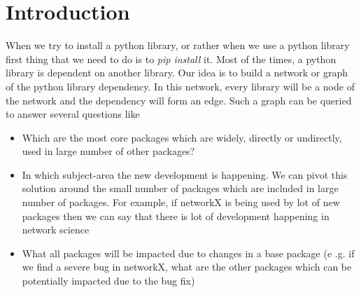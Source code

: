 \section{Introduction} \label{intro}
When we try to install a python library, or rather when we use a python
library first thing that we need to do is to \textit{pip install} it.
Most of the times, a python library is dependent on another library. Our idea
 is to build a network or graph of the python library dependency. In this
 network, every library will be a node of the network and the dependency
 will form an edge.
 Such a graph can be queried to answer several questions like
\begin{itemize}
\item Which are the most core packages which are widely, directly or
undirectly, used in large number of other packages?
\item In which subject-area the new development is happening. We can pivot
this solution around the small number of packages which are included in large
 number of packages. For example, if networkX is being used by lot of new
 packages then we can say that there is lot of development happening in
 network science
\item What all packages will be impacted due to changes in a base package (e
.g. if we find a severe bug in networkX, what are the other packages which
can be potentially impacted due to the bug fix)
\end{itemize}
  